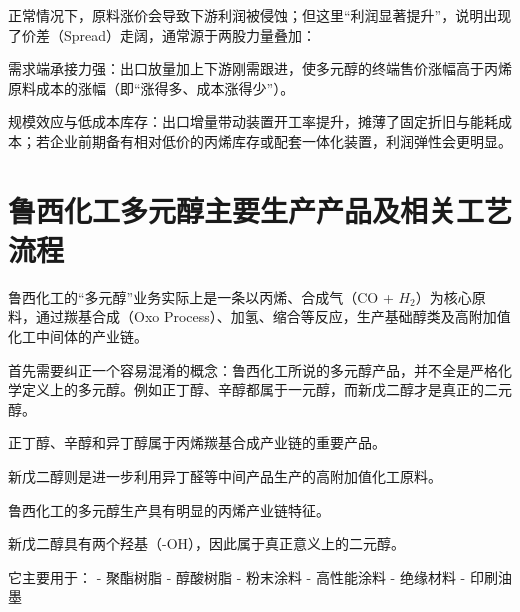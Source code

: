\documentclass{book}
\begin{document}
正常情况下，原料涨价会导致下游利润被侵蚀；但这里“利润显著提升”，说明出现了价差（Spread）走阔，通常源于两股力量叠加：

需求端承接力强：出口放量加上下游刚需跟进，使多元醇的终端售价涨幅高于丙烯原料成本的涨幅（即“涨得多、成本涨得少”）。

规模效应与低成本库存：出口增量带动装置开工率提升，摊薄了固定折旧与能耗成本；若企业前期备有相对低价的丙烯库存或配套一体化装置，利润弹性会更明显。

\chapter{鲁西化工多元醇主要生产产品及相关工艺流程}

鲁西化工的“多元醇”业务实际上是一条以丙烯、合成气（CO + $H_2$）为核心原料，通过羰基合成（Oxo Process）、加氢、缩合等反应，生产基础醇类及高附加值化工中间体的产业链。

首先需要纠正一个容易混淆的概念：鲁西化工所说的多元醇产品，并不全是严格化学定义上的多元醇。例如正丁醇、辛醇都属于一元醇，而新戊二醇才是真正的二元醇。

正丁醇、辛醇和异丁醇属于丙烯羰基合成产业链的重要产品。

新戊二醇则是进一步利用异丁醛等中间产品生产的高附加值化工原料。

鲁西化工的多元醇生产具有明显的丙烯产业链特征。

新戊二醇具有两个羟基（-OH），因此属于真正意义上的二元醇。

它主要用于：
- 聚酯树脂
- 醇酸树脂
- 粉末涂料
- 高性能涂料
- 绝缘材料
- 印刷油墨
\end{document}
